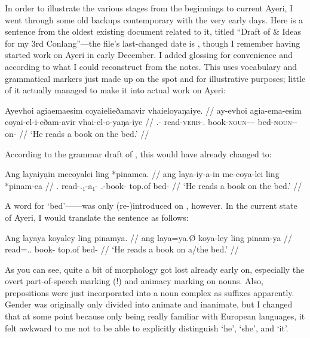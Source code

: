 In order to illustrate the various stages from the beginnings to current Ayeri,
I went through some old backups contemporary with the very early days. 
Here is a sentence from the oldest existing document related to it, titled 
``Draft of \& Ideas for my 3rd Conlang''---the file's last-changed date is 
, though I remember having started work on Ayeri in early 
December. I added glossing for convenience and according to what I could 
reconstruct from the notes. This uses vocabulary and grammatical markers just 
made up on the spot and for illustrative purposes; little of it actually 
managed to make it into actual work on Ayeri:

\ex\begingl
	\gla Ayevhoi agiaemaesim coyaielieðamavir vhaieloyaŋaiye. //
	\glb ay-evhoi agia-ema-esim coyai-el-i-eðam-avir vhai-el-o-yaŋa-iye //
	\glc \Tsg{}.\An{}-\Sbj{} read-\textsc{verb}-\Sbj{}.\An{} 
		book-\textsc{noun}-\An{}-\Indf{}-\Parg{} 
		bed-\textsc{noun}-\Inan{}-on-\Loc{} //
	\glft `He reads a book on the bed.' //
\endgl\xe

According to the grammar draft of , this would have already 
changed to:

\ex\begingl
	\gla Ang layaiyạin mecoyalei ling *pinamea. //
	\glb ang laya-iy-a-in me-coya-lei ling *pinam-ea //
	\glc \Aarg{}.\Sbj{} read-\Tsg{}.\An{}₁-a₁-\Sbj{} 
		\Indf{}.\Inan{}-book-\PargI{} top.of bed-\Loc{} //
	\glft `He reads a book on the bed.' //
\endgl\xe

A word for `bed'------was only (re-)introduced on 
, however. In the current state of Ayeri, I would translate 
the sentence as follows:

\ex\begingl
	\gla Ang layaya koyaley ling pinamya. //
	\glb ang laya=ya.Ø koya-ley ling pinam-ya //
	\glc \AgtT{} read=\Tsg{}.\M{}.\Top{} book-\PargI{} top.of bed-\Loc{} //
	\glft `He reads a book on a/the bed.' //
\endgl\xe

As you can see, quite a bit of morphology got lost already early on, especially 
the overt part-of-speech marking (!) and animacy marking on nouns. Also, 
prepositions were just incorporated into a noun complex as suffixes apparently. 
Gender was originally only divided into animate and inanimate, but I changed 
that at some point because only being really familiar with European languages, 
it felt awkward to me not to be able to explicitly distinguish `he', `she', and 
`it'.

